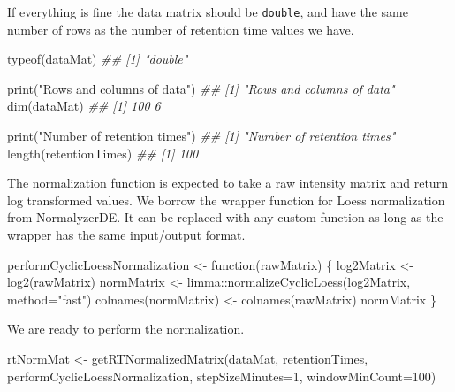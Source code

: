 \documentclass[]{article}
\newcommand{\hlnum}[1]{\textcolor[rgb]{0.816,0.125,0.439}{#1}}%
\newcommand{\hlstr}[1]{\textcolor[rgb]{0.251,0.627,0.251}{#1}}%
\newcommand{\hlcom}[1]{\textcolor[rgb]{0.502,0.502,0.502}{\textit{#1}}}%
\newcommand{\hlstd}[1]{\textcolor[rgb]{0.251,0.251,0.251}{#1}}%
\newcommand{\hlkwd}[1]{\textcolor[rgb]{0.878,0.439,0.125}{#1}}%
\newenvironment{Shaded}{\begin{myshaded}}{\end{myshaded}}
\newcommand{\DecValTok}[1]{\hlnum{#1}}
\newcommand{\SpecialCharTok}[1]{\hlstr{#1}}
\newcommand{\StringTok}[1]{\hlstr{#1}}
\newcommand{\DocumentationTok}[1]{\hlcom{#1}}
\newcommand{\OtherTok}[1]{{#1}}
\newcommand{\FunctionTok}[1]{\hlstd{#1}}
\newcommand{\ControlFlowTok}[1]{\hlkwd{#1}}
\newcommand{\AttributeTok}[1]{{#1}}
\newcommand{\NormalTok}[1]{\hlstd{#1}}
\begin{document}
If everything is fine the data matrix should be \texttt{double}, and have the same number of rows as the number of retention time values we have.

\begin{Shaded}
\begin{Highlighting}[]
\FunctionTok{typeof}\NormalTok{(dataMat)}
\DocumentationTok{\#\# [1] "double"}

\FunctionTok{print}\NormalTok{(}\StringTok{"Rows and columns of data"}\NormalTok{)}
\DocumentationTok{\#\# [1] "Rows and columns of data"}
\FunctionTok{dim}\NormalTok{(dataMat)}
\DocumentationTok{\#\# [1] 100   6}

\FunctionTok{print}\NormalTok{(}\StringTok{"Number of retention times"}\NormalTok{)}
\DocumentationTok{\#\# [1] "Number of retention times"}
\FunctionTok{length}\NormalTok{(retentionTimes)}
\DocumentationTok{\#\# [1] 100}
\end{Highlighting}
\end{Shaded}

The normalization function is expected to take a raw intensity matrix and return log transformed values. We borrow the wrapper function for Loess normalization from NormalyzerDE. It can be replaced with any custom function as long as the wrapper has the same input/output format.

\begin{Shaded}
\begin{Highlighting}[]
\NormalTok{performCyclicLoessNormalization }\OtherTok{\textless{}{-}} \ControlFlowTok{function}\NormalTok{(rawMatrix) \{}
\NormalTok{    log2Matrix }\OtherTok{\textless{}{-}} \FunctionTok{log2}\NormalTok{(rawMatrix)}
\NormalTok{    normMatrix }\OtherTok{\textless{}{-}}\NormalTok{ limma}\SpecialCharTok{::}\FunctionTok{normalizeCyclicLoess}\NormalTok{(log2Matrix, }\AttributeTok{method=}\StringTok{"fast"}\NormalTok{)}
    \FunctionTok{colnames}\NormalTok{(normMatrix) }\OtherTok{\textless{}{-}} \FunctionTok{colnames}\NormalTok{(rawMatrix)}
\NormalTok{    normMatrix}
\NormalTok{\}}
\end{Highlighting}
\end{Shaded}

We are ready to perform the normalization.

\begin{Shaded}
\begin{Highlighting}[]
\NormalTok{rtNormMat }\OtherTok{\textless{}{-}} \FunctionTok{getRTNormalizedMatrix}\NormalTok{(dataMat, }
\NormalTok{                                   retentionTimes, }
\NormalTok{                                   performCyclicLoessNormalization, }
                                   \AttributeTok{stepSizeMinutes=}\DecValTok{1}\NormalTok{, }
                                   \AttributeTok{windowMinCount=}\DecValTok{100}\NormalTok{)}
\end{Highlighting}
\end{Shaded}
\end{document}
